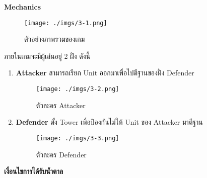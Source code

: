 \documentclass[12pt,oneside,openright,a4paper]{cpe-thai-project}
\begin{document}
\textbf{Mechanics} 

\begin{figure}[H]\centering
  \texttt{[image: ./imgs/3-1.png]}
  \caption{ตัวอย่างภาพรวมของเกม}\label{fig:3-1}
\end{figure}

ภายในเกมจะมีผู้เล่นอยู่ 2 ฝั่ง ดังนี้
\begin{enumerate}
  \item \textbf{Attacker} สามารถเรียก Unit ออกมาเพื่อไปตีฐานของฝั่ง Defender
  \begin{figure}[H]\centering
    \texttt{[image: ./imgs/3-2.png]}
    \caption{ตัวละคร Attacker}\label{fig:3-2}
  \end{figure}

  \pagebreak
  \item \textbf{Defender} ตั้ง Tower เพื่อป้องกันไม่ให้ Unit ของ Attacker มาตีฐาน
  \begin{figure}[H]\centering
    \texttt{[image: ./imgs/3-3.png]}
    \caption{ตัวละคร Defender}\label{fig:3-3}
  \end{figure}
\end{enumerate}

\textbf{เงื่อนไขการได้รับน้ำตาล}
\end{document}
